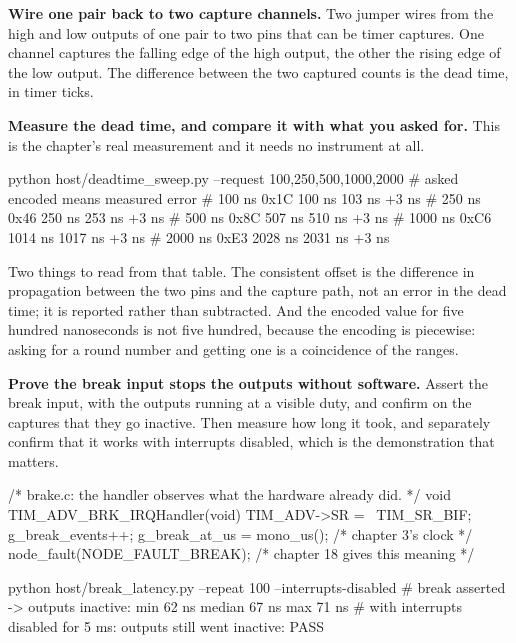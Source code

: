 \begin{steps}

\item \textbf{Wire one pair back to two capture channels.} Two jumper wires from
the high and low outputs of one pair to two pins that can be timer captures. One
channel captures the falling edge of the high output, the other the rising edge
of the low output. The difference between the two captured counts is the dead
time, in timer ticks.

\item \textbf{Measure the dead time, and compare it with what you asked for.}
This is the chapter's real measurement and it needs no instrument at all.
\begin{shellcode}
python host/deadtime_sweep.py --request 100,250,500,1000,2000
# asked   encoded   means    measured   error
#  100 ns   0x1C     100 ns     103 ns    +3 ns
#  250 ns   0x46     250 ns     253 ns    +3 ns
#  500 ns   0x8C     507 ns     510 ns    +3 ns
# 1000 ns   0xC6    1014 ns    1017 ns    +3 ns
# 2000 ns   0xE3    2028 ns    2031 ns    +3 ns
\end{shellcode}
Two things to read from that table. The consistent offset is the difference in
propagation between the two pins and the capture path, not an error in the dead
time; it is reported rather than subtracted. And the encoded value for five
hundred nanoseconds is not five hundred, because the encoding is piecewise:
asking for a round number and getting one is a coincidence of the ranges.

\item \textbf{Prove the break input stops the outputs without software.} Assert
the break input, with the outputs running at a visible duty, and confirm on the
captures that they go inactive. Then measure how long it took, and separately
confirm that it works with interrupts disabled, which is the demonstration that
matters.
\begin{ccode}
/* brake.c: the handler observes what the hardware already did. */
void TIM_ADV_BRK_IRQHandler(void)
{
    TIM_ADV->SR = ~TIM_SR_BIF;
    g_break_events++;
    g_break_at_us = mono_us();          /* chapter 3's clock */
    node_fault(NODE_FAULT_BREAK);       /* chapter 18 gives this meaning */
}
\end{ccode}
\begin{shellcode}
python host/break_latency.py --repeat 100 --interrupts-disabled
# break asserted -> outputs inactive: min 62 ns  median 67 ns  max 71 ns
# with interrupts disabled for 5 ms: outputs still went inactive: PASS
\end{shellcode}


\end{steps}
